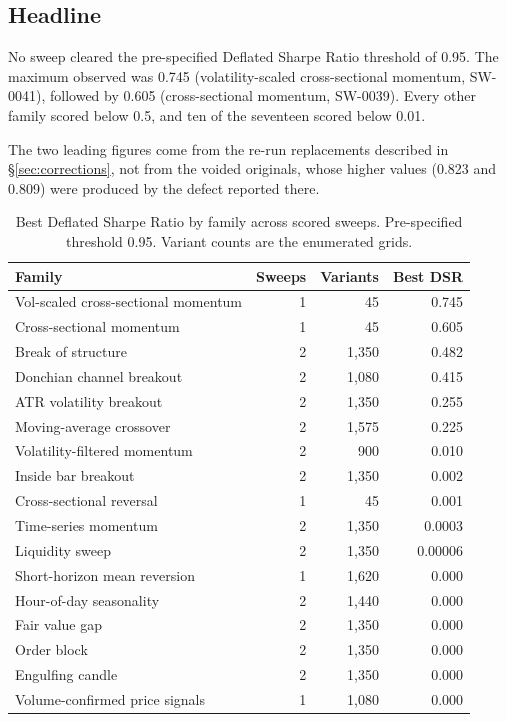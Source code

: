 \documentclass[11pt,a4paper]{article}
\begin{document}
\subsection{Headline}

No sweep cleared the pre-specified Deflated Sharpe Ratio threshold of 0.95.
The maximum observed was 0.745 (volatility-scaled cross-sectional momentum,
SW-0041), followed by 0.605 (cross-sectional momentum, SW-0039). Every other
family scored below 0.5, and ten of the
seventeen scored below 0.01.

The two leading figures come from the re-run replacements described in
\S\ref{sec:corrections}, not from the voided originals, whose higher values
(0.823 and 0.809) were produced by the defect reported there.

\begin{table}[ht]
\centering
\small
\begin{tabular}{lrrr}
\toprule
Family & Sweeps & Variants & Best DSR \\
\midrule
Vol-scaled cross-sectional momentum & 1 & 45 & 0.745 \\
Cross-sectional momentum & 1 & 45 & 0.605 \\
Break of structure & 2 & 1{,}350 & 0.482 \\
Donchian channel breakout & 2 & 1{,}080 & 0.415 \\
ATR volatility breakout & 2 & 1{,}350 & 0.255 \\
Moving-average crossover & 2 & 1{,}575 & 0.225 \\
Volatility-filtered momentum & 2 & 900 & 0.010 \\
Inside bar breakout & 2 & 1{,}350 & 0.002 \\
Cross-sectional reversal & 1 & 45 & 0.001 \\
Time-series momentum & 2 & 1{,}350 & 0.0003 \\
Liquidity sweep & 2 & 1{,}350 & 0.00006 \\
Short-horizon mean reversion & 1 & 1{,}620 & 0.000 \\
Hour-of-day seasonality & 2 & 1{,}440 & 0.000 \\
Fair value gap & 2 & 1{,}350 & 0.000 \\
Order block & 2 & 1{,}350 & 0.000 \\
Engulfing candle & 2 & 1{,}350 & 0.000 \\
Volume-confirmed price signals & 1 & 1{,}080 & 0.000 \\
\bottomrule
\end{tabular}
\caption{Best Deflated Sharpe Ratio by family across scored sweeps.
Pre-specified threshold 0.95. Variant counts are the enumerated grids.}
\end{table}
\end{document}
